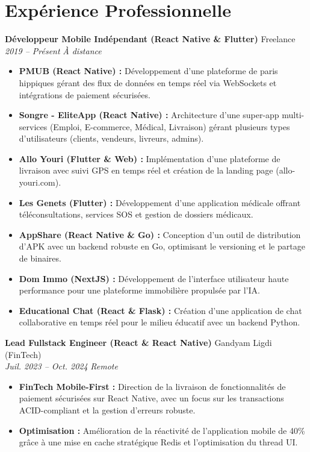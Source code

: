 \documentclass[a4paper,10pt]{article}
\newcommand{\jobheader}[4]{%
    \textbf{#1} \hfill #2 \\
    \textit{#3} \hfill \textit{#4}
    \vspace{0.05cm}
}
\begin{document}
\section*{Expérience Professionnelle}

\jobheader{Développeur Mobile Indépendant (React Native \& Flutter)}{Freelance}{2019 -- Présent}{À distance}
\begin{itemize}[leftmargin=*,nosep]
    \item \textbf{PMUB (React Native) :} Développement d'une plateforme de paris hippiques gérant des flux de données en temps réel via WebSockets et intégrations de paiement sécurisées.
    \item \textbf{Songre - EliteApp (React Native) :} Architecture d'une super-app multi-services (Emploi, E-commerce, Médical, Livraison) gérant plusieurs types d'utilisateurs (clients, vendeurs, livreurs, admins).
    \item \textbf{Allo Youri (Flutter \& Web) :} Implémentation d'une plateforme de livraison avec suivi GPS en temps réel et création de la landing page (allo-youri.com).
    \item \textbf{Les Genets (Flutter) :} Développement d'une application médicale offrant téléconsultations, services SOS et gestion de dossiers médicaux.
    \item \textbf{AppShare (React Native \& Go) :} Conception d'un outil de distribution d'APK avec un backend robuste en Go, optimisant le versioning et le partage de binaires.
    \item \textbf{Dom Immo (NextJS) :} Développement de l'interface utilisateur haute performance pour une plateforme immobilière propulsée par l'IA.
    \item \textbf{Educational Chat (React \& Flask) :} Création d'une application de chat collaborative en temps réel pour le milieu éducatif avec un backend Python.
\end{itemize}

\vspace{0.15cm}

\jobheader{Lead Fullstack Engineer (React \& React Native)}{Gandyam Ligdi (FinTech)}{Juil. 2023 -- Oct. 2024}{Remote}
\begin{itemize}[leftmargin=*,nosep]
    \item \textbf{FinTech Mobile-First :} Direction de la livraison de fonctionnalités de paiement sécurisées sur React Native, avec un focus sur les transactions ACID-compliant et la gestion d'erreurs robuste.
    \item \textbf{Optimisation :} Amélioration de la réactivité de l'application mobile de 40\% grâce à une mise en cache stratégique Redis et l'optimisation du thread UI.
\end{itemize}
\end{document}
